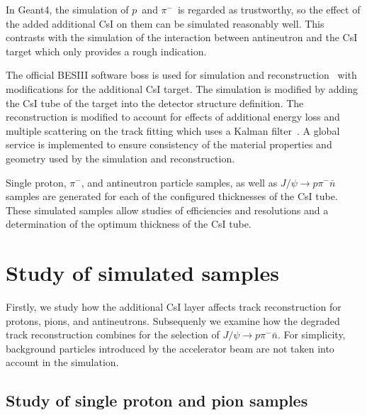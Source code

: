 \documentclass[aps,preprint,showkeys,superscriptaddress]{revtex4}
\newcommand{\pp}{$p$}
\newcommand{\pim}{$\pi^-$}
\begin{document}
In Geant4, the simulation of \pp\ and \pim\ is
regarded as trustworthy, so the effect of the added additional CsI on them can be simulated
reasonably well. This contrasts with the simulation of the interaction between 
antineutron and the CsI target which only provides a rough indication. 

%
    
The official BESIII software {\sc boss} is used for simulation and 
reconstruction~\cite{boss,bes3physics,bes3hough} with modifications
for the additional CsI target. The simulation is modified by adding the CsI tube 
of the target into the detector structure definition. 
The reconstruction is modified to account for effects of additional energy loss 
and multiple scattering on the track fitting which uses a Kalman filter~\cite{kalFit}.
A global service is implemented to ensure consistency of the material properties and geometry  
used by the simulation and reconstruction. 

Single proton, $\pi^-$, and antineutron particle samples, as well as $J/\psi\to p \pi^- \bar{n}$ 
samples are generated for each of the configured thicknesses of the CsI tube. 
These simulated samples allow studies of efficiencies and resolutions and a determination 
of the optimum thickness of the CsI tube. 


\section{Study of simulated samples}
\label{sec:results}

Firstly, we study how the additional CsI layer affects track reconstruction 
for protons, pions, and antineutrons. Subsequenly we examine how the degraded track 
reconstruction combines for the selection of $J/\psi\to p \pi^- \bar{n}$. 
For simplicity, background particles introduced by the accelerator beam are not taken 
into account in the simulation.

\subsection{Study of single proton and pion samples}
\end{document}
